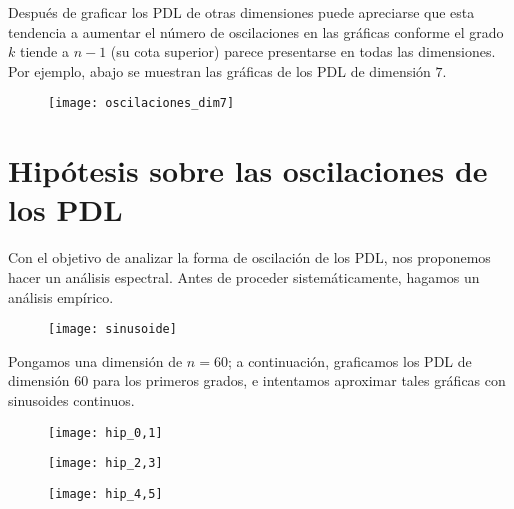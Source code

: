 Después de graficar los PDL de otras dimensiones
puede apreciarse que esta tendencia a aumentar el número
de oscilaciones en las gráficas conforme el grado $k$
tiende a $n-1$ (su cota superior)
parece presentarse en todas las dimensiones.
Por ejemplo, abajo se muestran las gráficas de los 
PDL de dimensión $7$.

\begin{figure}[H]
	\centering
	\texttt{[image: oscilaciones\_dim7]} 
\end{figure}	

\section{Hipótesis sobre las oscilaciones de los PDL}

Con el objetivo de analizar la forma
de oscilación de los PDL, nos proponemos
hacer un análisis espectral. Antes
de proceder sistemáticamente, hagamos un análisis empírico.
\begin{figure}[H]
	\centering
	\texttt{[image: sinusoide]} 
\end{figure}	

Pongamos una dimensión de $n = 60$; a continuación,
graficamos los PDL de dimensión $60$ para los primeros grados,
e intentamos aproximar tales gráficas con sinusoides continuos.


\begin{figure}[H]
	\centering
	\texttt{[image: hip\_0,1]} 
\end{figure}	

\begin{figure}[H]
	\centering
	\texttt{[image: hip\_2,3]} 
\end{figure}	

\begin{figure}[H]
	\centering
	\texttt{[image: hip\_4,5]} 
\end{figure}	


